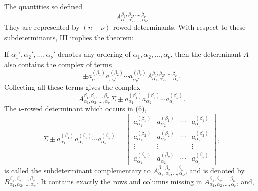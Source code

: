 
The quantities so defined
\[
        A_{\alpha_1,\alpha_2,\ldots,\alpha_\nu}^{\beta_1,\beta_2,\ldots,\beta_\nu}
\]
 They are represented by \((n-\nu)\)-rowed determinants. With respect to these subdeterminants, III implies the theorem:


If \(\alpha_1',\alpha_2',\ldots,\alpha_\nu'\) denotes any ordering of \(\alpha_1,\alpha_2,\ldots,\alpha_\nu\), then the determinant \(A\) also contains the complex of terms
\[
        \pm a_{\alpha_1'}^{(\beta_1)}a_{\alpha_2'}^{(\beta_2)}\cdots
        a_{\alpha_\nu'}^{(\beta_\nu)}
        A_{\alpha_1,\alpha_2,\ldots,\alpha_\nu}^{\beta_1,\beta_2,\ldots,\beta_\nu}.
\]
Collecting all these terms gives the complex
\begin{equation}
        A_{\alpha_1,\alpha_2,\ldots,\alpha_\nu}^{\beta_1,\beta_2,\ldots,\beta_\nu}
        \Sigma \pm a_{\alpha_1}^{(\beta_1)}a_{\alpha_2}^{(\beta_2)}\cdots
        a_{\alpha_\nu}^{(\beta_\nu)}.
\tag{6}
\end{equation}
The \(\nu\)-rowed determinant which occurs in (6),
\[
        \Sigma\pm a_{\alpha_1}^{(\beta_1)}a_{\alpha_2}^{(\beta_2)}\cdots a_{\alpha_\nu}^{(\beta_\nu)}=
        \begin{vmatrix}
        a_{\alpha_1}^{(\beta_1)}&a_{\alpha_2}^{(\beta_1)}&\cdots&a_{\alpha_\nu}^{(\beta_1)}\\
        a_{\alpha_1}^{(\beta_2)}&a_{\alpha_2}^{(\beta_2)}&\cdots&a_{\alpha_\nu}^{(\beta_2)}\\
        \vdots&\vdots&&\vdots\\
        a_{\alpha_1}^{(\beta_\nu)}&a_{\alpha_2}^{(\beta_\nu)}&\cdots&a_{\alpha_\nu}^{(\beta_\nu)}
        \end{vmatrix},
\]
is called the subdeterminant complementary to
\(A_{\alpha_1,\alpha_2,\ldots,\alpha_\nu}^{\beta_1,\beta_2,\ldots,\beta_\nu}\), and is denoted by
\(B_{\alpha_1,\alpha_2,\ldots,\alpha_\nu}^{\beta_1,\beta_2,\ldots,\beta_\nu}\).
It contains exactly the rows and columns missing in \(A_{\alpha_1,\alpha_2,\ldots,\alpha_\nu}^{\beta_1,\beta_2,\ldots,\beta_\nu}\), and,

